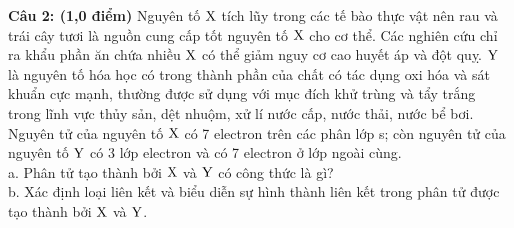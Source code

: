 \documentclass[11pt,a4paper]{article}
\begin{document}
\vspace{4pt}
\noindent
\textbf{Câu 2: (1,0 điểm)} Nguyên tố $\ce{X}$ tích lũy trong các tế bào thực vật nên rau và trái cây tươi là nguồn cung cấp tốt nguyên tố $\ce{X}$ cho cơ thể. Các nghiên cứu chỉ ra khẩu phần ăn chứa nhiều $\ce{X}$ có thể giảm nguy cơ cao huyết áp và đột quỵ. $\ce{Y}$ là nguyên tố hóa học có trong thành phần của chất có tác dụng oxi hóa và sát khuẩn cực mạnh, thường được sử dụng với mục đích khử trùng và tẩy trắng trong lĩnh vực thủy sản, dệt nhuộm, xử lí nước cấp, nước thải, nước bể bơi. Nguyên tử của nguyên tố $\ce{X}$ có 7 electron trên các phân lớp s; còn nguyên tử của nguyên tố $\ce{Y}$ có 3 lớp electron và có 7 electron ở lớp ngoài cùng.\\
a. Phân tử tạo thành bởi $\ce{X}$ và $\ce{Y}$ có công thức là gì?\\
b. Xác định loại liên kết và biểu diễn sự hình thành liên kết trong phân tử được tạo thành bởi $\ce{X}$ và $\ce{Y}$.
\end{document}
